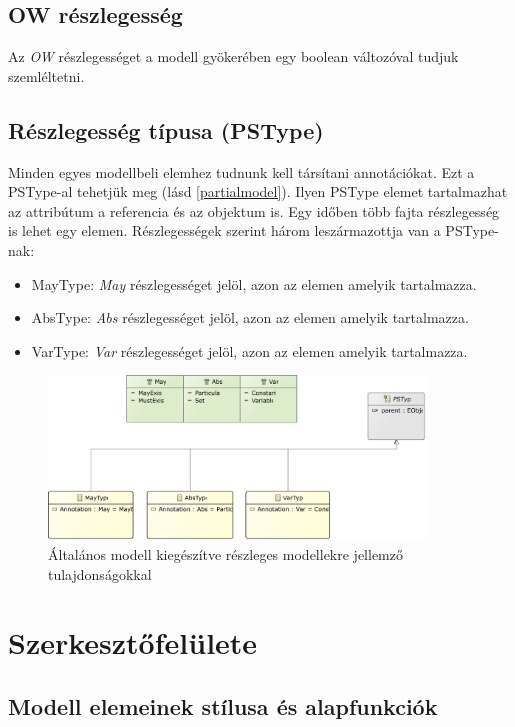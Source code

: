 \subsection{OW részlegesség}
Az \textit{OW} részlegességet a modell gyökerében egy boolean változóval tudjuk szemléltetni.

\subsection{Részlegesség típusa (PSType)}
Minden egyes modellbeli elemhez tudnunk kell társítani annotációkat. Ezt a PSType-al tehetjük meg (lásd \autoref{partialmodel}). Ilyen PSType elemet tartalmazhat az attribútum a referencia és az objektum is. Egy időben több fajta részlegesség is lehet egy elemen. Részlegességek szerint három leszármazottja van a PSType-nak:

\begin{itemize}  
	\item MayType: \textit{May} részlegességet jelöl, azon az elemen amelyik tartalmazza. 
	\item AbsType: \textit{Abs} részlegességet jelöl, azon az elemen amelyik tartalmazza.
	\item VarType: \textit{Var} részlegességet jelöl, azon az elemen amelyik tartalmazza.
\end{itemize}

\begin{figure}[!ht]
	\centering
	\includegraphics[width=100mm]{figures/partialmodel02.pdf}
	\caption{Általános modell kiegészítve részleges modellekre jellemző tulajdonságokkal}
	\label{partialmodel} 
\end{figure}

\section{Szerkesztőfelülete}
\subsection{Modell elemeinek stílusa és alapfunkciók}
